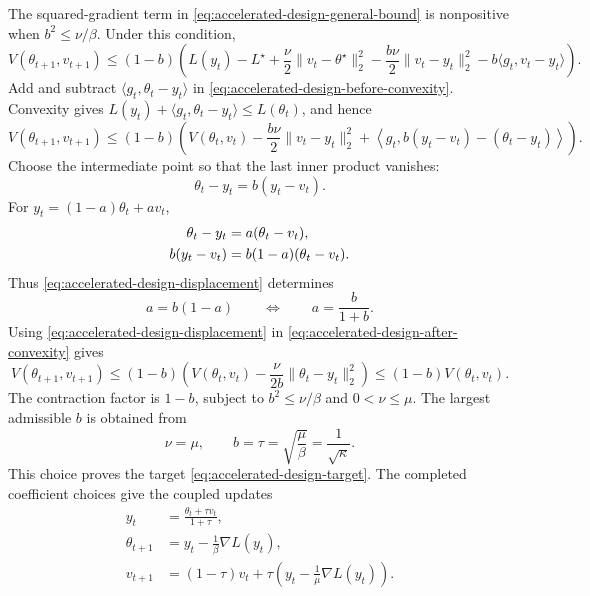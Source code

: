 \documentclass[11pt,twoside]{article}
\theoremstyle{definition}
\theoremstyle{remark}
\begin{document}
The squared-gradient term in
\cref{eq:accelerated-design-general-bound} is nonpositive when
$b^2\le\nu/\beta$. Under this condition,
\begin{equation}
 V(\theta_{t+1},v_{t+1})
 \le(1-b)\left(
 L(y_t)-L^\star+\frac\nu2\|v_t-\theta^\star\|_2^2
 -\frac{b\nu}{2}\|v_t-y_t\|_2^2
 -b\langle g_t,v_t-y_t\rangle
 \right).
 \label{eq:accelerated-design-before-convexity}
\end{equation}
Add and subtract $\langle g_t,\theta_t-y_t\rangle$ in
\cref{eq:accelerated-design-before-convexity}. Convexity gives
$L(y_t)+\langle g_t,\theta_t-y_t\rangle\le L(\theta_t)$, and hence
\begin{equation}
 V(\theta_{t+1},v_{t+1})
 \le(1-b)\left(V(\theta_t,v_t)-\frac{b\nu}{2}\|v_t-y_t\|_2^2
 +\left\langle g_t,b(y_t-v_t)-(\theta_t-y_t)\right\rangle\right).
 \label{eq:accelerated-design-after-convexity}
\end{equation}
Choose the intermediate point so that the last inner product vanishes:
\begin{equation}
 \theta_t-y_t=b(y_t-v_t).
 \label{eq:accelerated-design-displacement}
\end{equation}
For $y_t=(1-a)\theta_t+a v_t$,
\begin{align}
 \theta_t-y_t&=a(\theta_t-v_t),\notag\\
 b(y_t-v_t)&=b(1-a)(\theta_t-v_t).
\end{align}
Thus \cref{eq:accelerated-design-displacement} determines
\begin{equation}
 a=b(1-a)
 \qquad\Longleftrightarrow\qquad
 a=\frac{b}{1+b}.
 \label{eq:accelerated-coupling-coefficient}
\end{equation}
Using \cref{eq:accelerated-design-displacement} in
\cref{eq:accelerated-design-after-convexity} gives
\begin{equation}
 V(\theta_{t+1},v_{t+1})
 \le(1-b)\left(
 V(\theta_t,v_t)-\frac\nu{2b}\|\theta_t-y_t\|_2^2
 \right)
 \le(1-b)V(\theta_t,v_t).
 \label{eq:accelerated-design-contraction}
\end{equation}
The contraction factor is $1-b$, subject to $b^2\le\nu/\beta$ and
$0<\nu\le\mu$. The largest admissible $b$ is obtained from
\begin{equation}
 \nu=\mu,
 \qquad
 b=\tau=\sqrt{\frac\mu\beta}=\frac1{\sqrt\kappa}.
 \label{eq:accelerated-design-balance}
\end{equation}
This choice proves the target \cref{eq:accelerated-design-target}. The
completed coefficient choices give the coupled updates
\begin{align}
 y_t&=\frac{\theta_t+\tau v_t}{1+\tau},
 \label{eq:accelerated-design-coupling}\\
 \theta_{t+1}&=y_t-\frac1\beta\nabla L(y_t),
 \label{eq:accelerated-design-gradient-step}\\
 v_{t+1}&=(1-\tau)v_t+\tau\left(y_t-\frac1\mu\nabla L(y_t)\right).
 \label{eq:accelerated-design-center-step}
\end{align}
\end{document}
